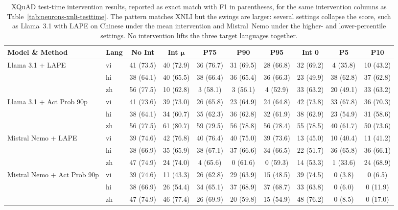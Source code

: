 \begin{table}[t]
	\centering
	\renewcommand{\arraystretch}{1.3}
	\setlength{\tabcolsep}{3.5pt}
	\begin{scriptsize}
		\begin{tabular}{llcccccccc}
			\toprule
			\textbf{Model \& Method} & \textbf{Lang} & \textbf{No Int} & \textbf{Int} $\bm{\mu}$ & \textbf{P75} & \textbf{P90} & \textbf{P95} & \textbf{Int 0} & \textbf{P5} & \textbf{P10} \\
			\midrule
			\multirow{3}{*}{Llama 3.1 + LAPE}
			& vi & 41 (73.5) & 40 (72.9) & 36 (76.7) & 31 (69.5) & 28 (66.8) & 32 (69.2) & 4 (35.8) & 10 (43.2) \\
			& hi & 38 (64.1) & 40 (65.5) & 38 (66.4) & 36 (65.4) & 36 (66.3) & 23 (49.9) & 38 (62.8) & 37 (62.8) \\
			& zh & 56 (77.5) & 10 (62.8) & 3 (58.1) & 3 (56.1) & 4 (52.9) & 33 (63.2) & 20 (49.1) & 33 (63.2) \\
			\midrule
			\multirow{3}{*}{Llama 3.1 + Act Prob 90p}
			& vi & 41 (73.6) & 39 (73.0) & 26 (65.8) & 23 (64.9) & 24 (64.8) & 42 (73.8) & 33 (67.8) & 36 (70.3) \\
			& hi & 38 (64.1) & 34 (60.7) & 35 (62.3) & 36 (62.8) & 32 (61.9) & 38 (62.9) & 23 (54.9) & 31 (58.6) \\
			& zh & 56 (77.5) & 61 (80.7) & 59 (79.5) & 56 (78.8) & 56 (78.4) & 55 (78.5) & 40 (61.7) & 50 (73.6) \\
			\midrule
			\multirow{3}{*}{Mistral Nemo + LAPE}
			& vi & 39 (74.6) & 42 (76.8) & 40 (76.4) & 40 (75.0) & 39 (73.6) & 13 (45.0) & 10 (40.4) & 11 (41.2) \\
			& hi & 38 (66.9) & 35 (65.9) & 38 (67.1) & 37 (66.6) & 34 (66.5) & 22 (51.7) & 36 (65.8) & 36 (66.1) \\
			& zh & 47 (74.9) & 24 (74.0) & 4 (65.6) & 0 (61.6) & 0 (59.3) & 14 (53.3) & 1 (33.6) & 24 (68.9) \\
			\midrule
			\multirow{3}{*}{Mistral Nemo + Act Prob 90p}
			& vi & 39 (74.6) & 11 (43.3) & 26 (62.8) & 29 (63.9) & 15 (48.5) & 39 (74.5) & 0 (3.8) & 0 (6.5) \\
			& hi & 38 (66.9) & 26 (54.4) & 34 (65.1) & 37 (68.9) & 37 (68.7) & 33 (63.8) & 0 (6.0) & 0 (11.9) \\
			& zh & 47 (74.9) & 46 (77.4) & 26 (69.9) & 20 (59.8) & 15 (54.9) & 48 (76.2) & 0 (8.5) & 0 (17.0) \\
			\bottomrule
		\end{tabular}
	\end{scriptsize}
	\caption{XQuAD test-time intervention results, reported as exact match with F1
		in parentheses, for the same intervention columns as
		Table~\ref{tab:neurons-xnli-testtime}. The pattern matches XNLI but the swings
		are larger: several settings collapse the score, such as Llama~3.1 with LAPE on
		Chinese under the mean intervention and Mistral~Nemo under the higher- and
		lower-percentile settings. No intervention lifts the three target languages
		together.}
	\label{tab:neurons-xquad-testtime}
\end{table}

